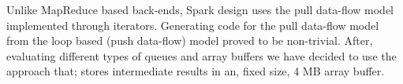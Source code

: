Unlike MapReduce based back-ends, Spark design uses the pull data-flow model implemented through iterators. Generating code for the pull data-flow model from the loop based (push data-flow) model proved to be non-trivial. After, evaluating different types of queues and array buffers we have decided to use the approach that; stores intermediate results in an, fixed size, 4 MB array buffer.